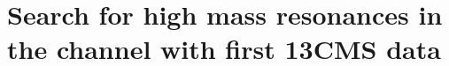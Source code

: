 \chapter{Search for high mass resonances in the \hww channel with first 13\TeV CMS data}\label{chap6}
